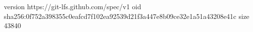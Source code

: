 version https://git-lfs.github.com/spec/v1
oid sha256:0f752a398355c0eafcd7f102ea92539d21f3a447e8b09ce32e1a51a43208e41c
size 43840

